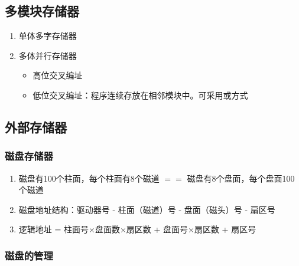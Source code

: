 \documentclass[./computer-organization-and-architecture.tex]{subfiles}
\begin{document}
    \subsection{多模块存储器}

    \begin{enumerate}
        \item 单体多字存储器
        \item 多体并行存储器
        \begin{itemize}
            \item 高位交叉编址
            \item 低位交叉编址：程序连续存放在相邻模块中。可采用{\color{customgreen}{轮流启动}}或{\color{customgreen}{同时启动}}方式
        \end{itemize}
    \end{enumerate}

    \subsection{外部存储器}

    \subsubsection{磁盘存储器}

    \begin{enumerate}
        \item 磁盘有100个柱面，每个柱面有8个磁道 $==$ 磁盘有8个盘面，每个盘面100个磁道
        \item 磁盘地址结构：驱动器号 - 柱面（磁道）号 - 盘面（磁头）号 - 扇区号
        \item 逻辑地址 = 柱面号$\times$盘面数$\times$扇区数 + 盘面号$\times$扇区数 + 扇区号
    \end{enumerate}

    \subsubsection{磁盘的管理}
\end{document}
